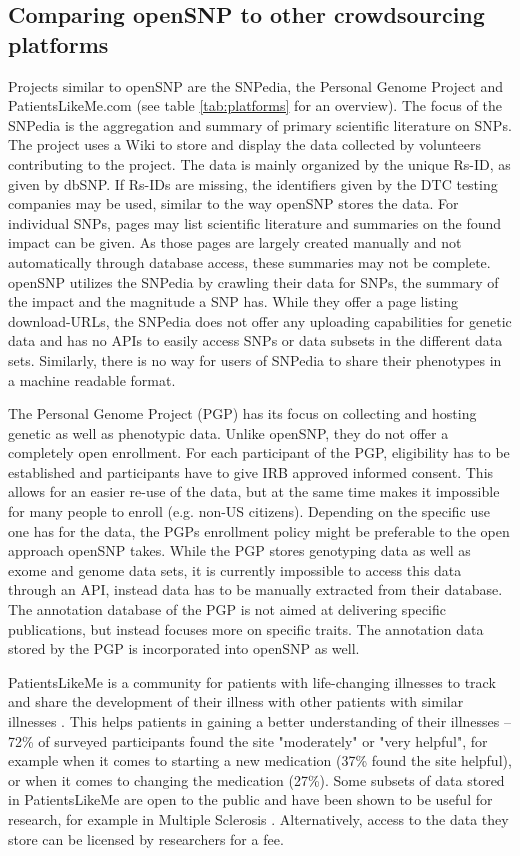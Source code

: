 \documentclass[10pt]{article}
\begin{document}
\subsection*{Comparing openSNP to other crowdsourcing platforms}
Projects similar to openSNP are the SNPedia, the Personal Genome Project and PatientsLikeMe.com (see table \ref{tab:platforms} for an overview). The focus of the SNPedia is the aggregation and summary of primary scientific literature on SNPs. The project uses a Wiki to store and display the data collected by volunteers contributing to the project. The data is mainly organized by the unique Rs-ID, as given by dbSNP. If Rs-IDs are missing, the identifiers given by the DTC testing companies may be used, similar to the way openSNP stores the data. For individual SNPs, pages may list scientific literature and summaries on the found impact can be given. As those pages are largely created manually and not automatically through database access, these summaries may not be complete. openSNP utilizes the SNPedia by crawling their data for SNPs, the summary of the impact and the magnitude a SNP has. While they offer a page listing download-URLs, the SNPedia does not offer any uploading capabilities for genetic data and has no APIs to easily access SNPs or data subsets in the different data sets. Similarly, there is no way for users of SNPedia to share their phenotypes in a machine readable format. 

The Personal Genome Project (PGP) has its focus on collecting and hosting genetic as well as phenotypic data. Unlike openSNP, they do not offer a completely open enrollment. For each participant of the PGP, eligibility has to be established and participants have to give IRB approved informed consent. This allows for an easier re-use of the data, but at the same time makes it impossible for many people to enroll (e.g. non-US citizens). Depending on the specific use one has for the data, the PGPs enrollment policy might be preferable to the open approach openSNP takes. While the PGP stores genotyping data as well as exome and genome data sets, it is currently impossible to access this data through an API, instead data has to be manually extracted from their database. The annotation database of the PGP is not aimed at delivering specific publications, but instead focuses more on specific traits. The annotation data stored by the PGP is incorporated into openSNP as well. 

PatientsLikeMe is a community for patients with life-changing illnesses to track and share the development of their illness with other patients with similar illnesses \cite{Wicks2010}.  This helps patients in gaining a better understanding of their illnesses -- 72\% of surveyed participants found the site "moderately" or "very helpful", for example when it comes to starting a new medication (37\% found the site helpful), or when it comes to changing the medication (27\%). Some subsets of data stored in PatientsLikeMe are open to the public and have been shown to be useful for research, for example in Multiple Sclerosis \cite{Bove2013}. Alternatively, access to the data they store can be licensed by researchers for a fee. 
\end{document}
